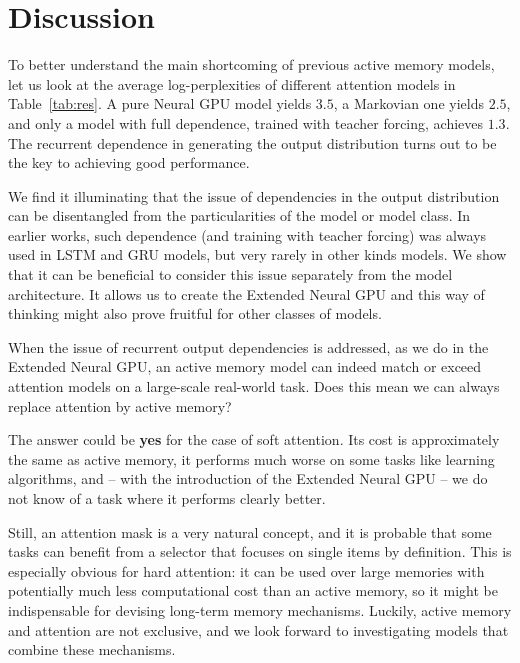 \documentclass{article}
\begin{document}
\section{Discussion} \label{sec:discuss}

To better understand the main shortcoming of previous active memory
models, let us look at the average log-perplexities of different
attention models in Table~\ref{tab:res}. A pure Neural GPU model
yields $3.5$, a Markovian one yields $2.5$, and only a model with
full dependence, trained with teacher forcing, achieves $1.3$.
The recurrent dependence in generating the output distribution
turns out to be the key to achieving good performance.

We find it illuminating that the issue of dependencies in the output
distribution can be disentangled from the particularities of the
model or model class. In earlier works, such dependence (and training
with teacher forcing) was always used in LSTM and GRU models, but
very rarely in other kinds models. We show that it can be beneficial
to consider this issue separately from the model architecture.
It allows us to create the Extended Neural GPU and this way of
thinking might also prove fruitful for other classes of models.

When the issue of recurrent output dependencies is addressed,
as we do in the Extended Neural GPU, an active memory model can
indeed match or exceed attention models on a large-scale real-world
task. Does this mean we can always replace attention by active memory?

The answer could be \textbf{yes} for the case of soft attention.
Its cost is approximately the same as active memory, it performs
much worse on some tasks like learning algorithms, and -- with
the introduction of the Extended Neural GPU -- we do not know of a task
where it performs clearly better.

Still, an attention mask is a very natural concept, and it is probable
that some tasks can benefit from a selector that focuses on single
items by definition. This is especially obvious for hard attention:
it can be used over large memories with potentially much less computational
cost than an active memory, so it might be indispensable for
devising long-term memory mechanisms. Luckily, active memory and
attention are not exclusive, and we look forward to investigating
models that combine these mechanisms.


\small


\end{document}
